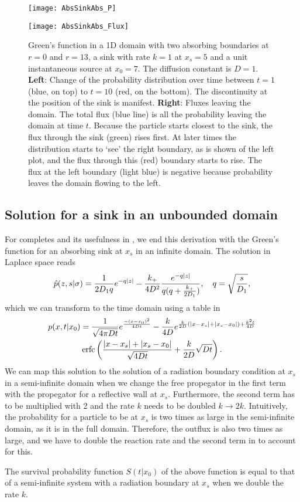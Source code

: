 \begin{figure}[ht]
\begin{minipage}[ht]{.5\linewidth}
\centering
\texttt{[image: AbsSinkAbs\_P]}
\end{minipage}
\begin{minipage}[ht]{.5\linewidth}
\centering
\texttt{[image: AbsSinkAbs\_Flux]}
\end{minipage}
\caption{ Green's function in a 1D domain with two absorbing boundaries at $r=0$ and $r=13$, a sink with rate $k=1$ at $x_s=5$ and a unit instantaneous source at $x_0=7$. The diffusion constant is $D=1$. {\bf Left}: Change of the probability distribution over time between $t=1$ (blue, on top) to $t=10$ (red, on the bottom). The discontinuity at the position of the sink is manifest. {\bf Right}: Fluxes leaving the domain. The total flux (blue line) is all the probability leaving the domain at time $t$. Because the particle starts closest to the sink, the flux through the sink (green) rises first. At later times the distribution starts to `see' the right boundary, as is shown of the left plot, and the flux through this (red) boundary starts to rise. The flux at the left boundary (light blue) is negative because probability leaves the domain flowing to the left. 
}
\end{figure}

\subsection{Solution for a sink in an unbounded domain}
For completes and its usefulness in \GFRD, we end this derivation with the Green's function for an absorbing sink at $x_s$ in an infinite domain. The solution in Laplace space reads
\begin{equation}
 \hat{p}(z,s|\sigma) = \frac{1}{2 D_1 q}e^{-q|z|} - \frac{k_+}{4 D^2}\frac{e^{-q|z|}}{q(q+\frac{k_+}{2 D_1})}, \quad q=\sqrt{\frac{s}{D_1}},
 \elabel{LSOL_NB}
\end{equation}
which we can transform to the time domain using a table in \cite{Carslaw1959}
\begin{multline}
 p(x,t|x_0) = \frac{1}{\sqrt{4 \pi D t}}e^{\frac{-(x-x_0)^2}{4 D t}} - \frac{k}{4 D}e^{\frac{k}{2 D}(|x-x_s|+|x_s-x_0|)+\frac{k^2 t}{4 D}} \\
\mathrm{erfc}\left( \frac{|x-x_s|+|x_s-x_0|}{\sqrt{4 D t}}+\frac{k}{2D}\sqrt{D t} \right).
\elabel{FSOL_NB}
\end{multline}
We can map this solution to the solution of a radiation boundary condition at $x_s$ in a semi-infinite domain when we change the free propegator in the first term with the propegator for a reflective wall at $x_s$. Furthermore, the second term has to be multiplied with 2 and the rate $k$ needs to be doubled $k \rightarrow 2 k$. Intuitively, the probability for a particle to be at $x_s$ is two times as large in the semi-infinite domain, as it is in the full domain. Therefore, the outflux is also two times as large, and we have to double the reaction rate and the second term in  to account for this.

The survival probability function $S(t|x_0)$ of the above function is equal to that of a semi-infinite system with a radiation boundary at $x_s$ when we double the rate $k$.